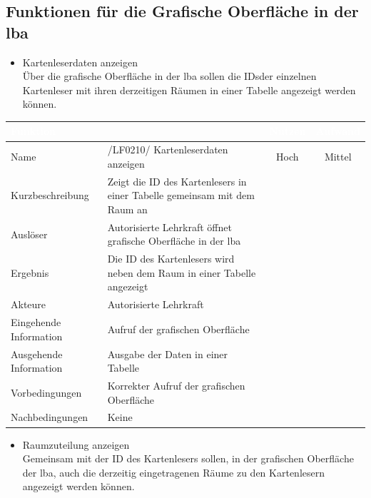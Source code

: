 \subsection{Funktionen für die Grafische Oberfläche in der \gls{lba}}
\begin{itemize}[leftmargin=1.0in]
    \item [\lf] Kartenleserdaten anzeigen \\
        Über die grafische Oberfläche in der \gls{lba} sollen die IDsder einzelnen Kartenleser mit ihren derzeitigen Räumen in einer Tabelle angezeigt werden können.
\end{itemize}
\begin{flushright}
    \begin{tabular}{| A{3cm}  A{6.5cm} | c | c |}
        \hline {} \textbf{\textcolor{white}{Funktion}} && \textbf{\textcolor{white}{Nutzen}} & \textbf{\textcolor{white}{Aufwand}}\\
        \hline \hline
        Name & /LF0210/ Kartenleserdaten anzeigen & Hoch & Mittel \\
        Kurzbeschreibung & Zeigt die ID des Kartenlesers in einer Tabelle gemeinsam mit dem Raum an &&  \\
        Auslöser & Autorisierte Lehrkraft öffnet grafische Oberfläche in der \gls{lba} &&  \\
        Ergebnis & Die ID des Kartenlesers wird neben dem Raum in einer Tabelle angezeigt &&  \\
        Akteure & Autorisierte Lehrkraft &&  \\
        Eingehende $   $Information & Aufruf der grafischen Oberfläche &&  \\
        Ausgehende  Information & Ausgabe der Daten in einer Tabelle &&  \\
        Vorbedingungen & Korrekter Aufruf der grafischen Oberfläche &&  \\
        Nachbedingungen & Keine  &&  \\
        \hline
    \end{tabular}
\end{flushright}
\newpage
\begin{itemize}[leftmargin=1.0in]
    \item [\lf] Raumzuteilung anzeigen \\
        Gemeinsam mit der ID des Kartenlesers sollen, in der grafischen Oberfläche der \gls{lba}, auch die derzeitig eingetragenen Räume zu den Kartenlesern angezeigt werden können.
\end{itemize}
